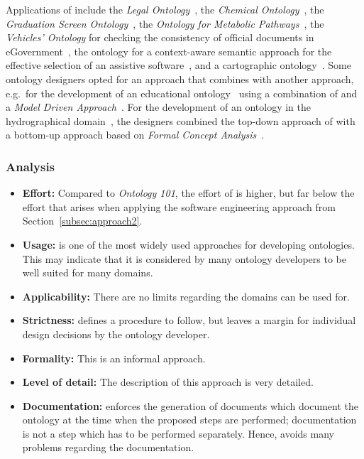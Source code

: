 Applications of \methontology include the \emph{Legal Ontology}~\cite{MethontologyLegal}, the \emph{Chemical Ontology}~\cite{MethontologyChemical}, the \emph{Graduation Screen Ontology}~\cite{GraduationScreenOntology}, the \emph{Ontology for Metabolic Pathways}~\cite{MetabolicPathways}, the \emph{Vehicles' Ontology} for checking the consistency of official documents in eGovernment~\cite{VehiclesOntology}, the ontology for a context-aware semantic approach for the effective selection of an assistive software~\cite{AssistiveSoftware}, and a cartographic ontology~\cite{CartographicOntology}. Some ontology designers opted for an approach that combines \methontology with another approach, e.g.\ for the development of an educational ontology~\cite{EducationalOntology} using a combination of \methontology and a \emph{Model Driven Approach}~\cite{ModelDrivenApproach}.
For the development of an ontology in the hydrographical domain~\cite{HydrographicalOntology}, the designers combined the top-down approach of \methontology with a bottom-up approach based on \emph{Formal Concept Analysis}~\cite{FormalConceptAnalysis}.

\subsubsection{Analysis}

\begin{itemize}
  \item \textbf{Effort:} Compared to \emph{Ontology 101}, the effort of \methontology is higher, but far below the effort that arises when applying the software engineering approach from Section~\ref{subsec:approach2}.
  
  \item \textbf{Usage:} \methontology is one of the most widely used approaches for developing ontologies. This may indicate that it is considered by many ontology developers to be well suited for many domains.
  
  \item \textbf{Applicability:} There are no limits regarding the domains \methontology can be used for.
  
  \item \textbf{Strictness:} \methontology defines a procedure to follow, but leaves a margin for individual design decisions by the ontology developer.
  
  \item \textbf{Formality:} This is an informal approach.
  
  \item \textbf{Level of detail:} The description of this approach is very detailed.
  
  \item \textbf{Documentation:} \methontology enforces the generation of documents which document the ontology at the time when the proposed steps are performed; documentation is not a step which has to be performed separately. Hence, \methontology avoids many problems regarding the documentation.
\end{itemize}

